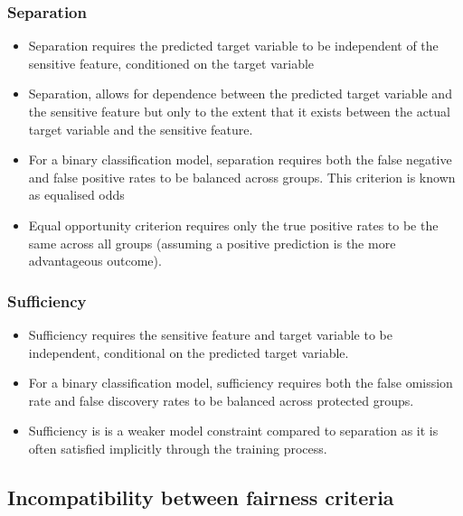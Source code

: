 \subsubsection*{Separation}

\begin{itemize}[leftmargin=*]
\item Separation requires the predicted target variable to be independent of the sensitive feature, conditioned on the target variable
%
\item Separation, allows for dependence between the predicted target variable and the sensitive feature but only to the extent that it exists between the actual target variable and the sensitive feature.
%
\item For a binary classification model, separation requires both the false negative and false positive rates to be balanced across groups. This criterion is known as equalised odds
%
\item Equal opportunity criterion requires only the true positive rates to be the same across all groups (assuming a positive prediction is the more advantageous outcome).
\end{itemize}

\subsubsection*{Sufficiency}

\begin{itemize}[leftmargin=*]
\item Sufficiency requires the sensitive feature and target variable to be independent, conditional on the predicted target variable.
%
\item For a binary classification model, sufficiency requires both the false omission rate and false discovery rates to be balanced across protected groups.
%
\item Sufficiency is is a weaker model constraint compared to separation as it is often satisfied implicitly through the training process.
\end{itemize}

\subsection*{Incompatibility between fairness criteria}

